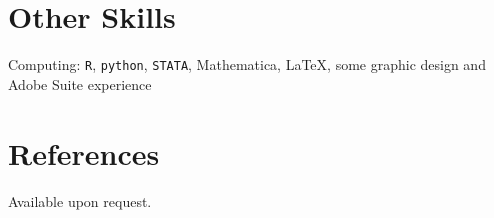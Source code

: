 \documentclass[
  11pt,
]
{article}
\begin{document}
\hypertarget{other-skills}{%
\section{Other Skills}\label{other-skills}}

Computing: \texttt{R}, \texttt{python}, \texttt{STATA}, Mathematica,
\LaTeX, some graphic design and Adobe Suite experience

\hypertarget{references}{%
\section{References}\label{references}}

Available upon request.
\end{document}
